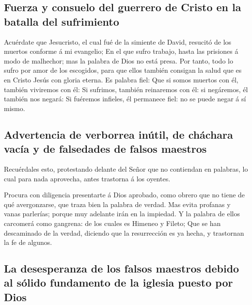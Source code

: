 \hypertarget{fuerza-y-consuelo-del-guerrero-de-cristo-en-la-batalla-del-sufrimiento}{%
\subsection{Fuerza y \hspace{0pt}\hspace{0pt}consuelo del guerrero de
Cristo en la batalla del
sufrimiento}\label{fuerza-y-consuelo-del-guerrero-de-cristo-en-la-batalla-del-sufrimiento}}

 Acuérdate que Jesucristo, el cual fué de la simiente de
David, resucitó de los muertos conforme á mi evangelio;  En
el que sufro trabajo, hasta las prisiones á modo de malhechor; mas la
palabra de Dios no está presa.  Por tanto, todo lo sufro
por amor de los escogidos, para que ellos también consigan la salud que
es en Cristo Jesús con gloria eterna.  Es palabra fiel: Que
si somos muertos con él, también viviremos con él:  Si
sufrimos, también reinaremos con él: si negáremos, él también nos
negará:  Si fuéremos infieles, él permanece fiel: no se
puede negar á sí mismo.

\hypertarget{advertencia-de-verborrea-inuxfatil-de-chuxe1chara-vacuxeda-y-de-falsedades-de-falsos-maestros}{%
\subsection{Advertencia de verborrea inútil, de cháchara vacía y de
falsedades de falsos
maestros}\label{advertencia-de-verborrea-inuxfatil-de-chuxe1chara-vacuxeda-y-de-falsedades-de-falsos-maestros}}

 Recuérdales esto, protestando delante del Señor que no
contiendan en palabras, lo cual para nada aprovecha, antes trastorna á
los oyentes.

 Procura con diligencia presentarte á Dios aprobado, como
obrero que no tiene de qué avergonzarse, que traza bien la palabra de
verdad.  Mas evita profanas y vanas parlerías; porque muy
adelante irán en la impiedad.  Y la palabra de ellos
carcomerá como gangrena: de los cuales es Himeneo y Fileto;
 Que se han descaminado de la verdad, diciendo que la
resurrección es ya hecha, y trastornan la fe de algunos.

\hypertarget{la-desesperanza-de-los-falsos-maestros-debido-al-suxf3lido-fundamento-de-la-iglesia-puesto-por-dios}{%
\subsection{La desesperanza de los falsos maestros debido al sólido
fundamento de la iglesia puesto por
Dios}\label{la-desesperanza-de-los-falsos-maestros-debido-al-suxf3lido-fundamento-de-la-iglesia-puesto-por-dios}}

